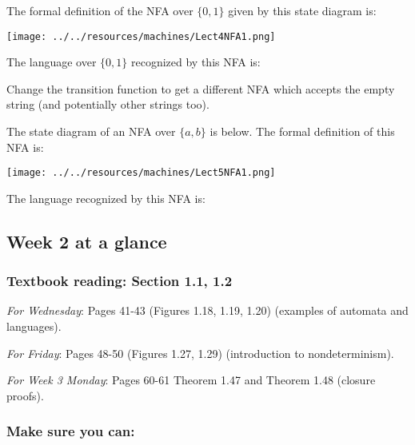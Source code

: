 \documentclass[12pt, oneside]{article}
\begin{document}
The formal definition of the NFA over $\{0,1\}$ given by this state diagram is: 

\texttt{[image: ../../resources/machines/Lect4NFA1.png]}

The language over $\{0,1\}$ recognized by this NFA is:

\vspace{70pt}

Change the transition function to get a different NFA which accepts
the empty string (and potentially other strings too).


\newpage

The state diagram of an NFA over $\{a,b\}$ is below.  The formal definition of this NFA is:

\vspace{-30pt}

\texttt{[image: ../../resources/machines/Lect5NFA1.png]}


\vspace{-10pt}

The language recognized by this NFA is:  


\newpage
\subsection*{Week 2 at a glance}

\subsubsection*{Textbook reading: Section 1.1, 1.2}

{\it For Wednesday}: Pages 41-43 (Figures 1.18, 1.19, 1.20) (examples of automata and languages).

{\it For Friday}: Pages 48-50 (Figures 1.27, 1.29) (introduction to nondeterminism).

{\it For Week 3 Monday}: Pages 60-61 Theorem 1.47 and Theorem 1.48 (closure proofs).


\subsubsection*{Make sure you can:}
\end{document}
